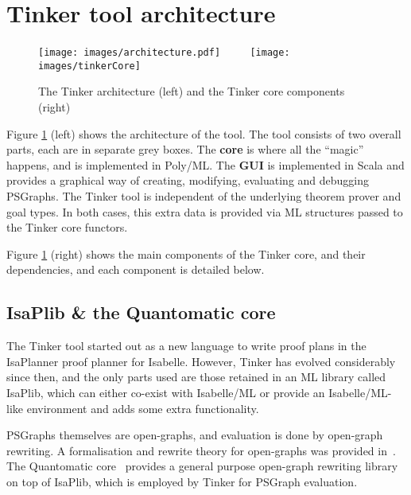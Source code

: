 \documentclass[submission,copyright,creativecommons]{eptcs}
\begin{document}
\section{Tinker tool architecture}\label{sec:arch}


\begin{figure}[h]
\vspace{-15pt}
\begin{center}
\texttt{[image: images/architecture.pdf]}
$\qquad$
\texttt{[image: images/tinkerCore]}
\end{center}
\vspace{-15pt}
\caption{The Tinker architecture (left) and the Tinker core components (right)}\label{fig:arch}
\end{figure}

\noindent Figure \ref{fig:arch} (left) shows the architecture of the tool. The tool consists of two overall parts, each are in separate grey boxes.
The \textbf{core} is where all the ``magic'' happens, and is implemented in Poly/ML. The \textbf{GUI} is implemented in Scala and provides
a graphical way of creating, modifying, evaluating and debugging PSGraphs. The Tinker tool is independent of the underlying theorem prover and goal types. In both cases, this extra data is provided via ML structures passed to the Tinker core functors.

Figure \ref{fig:arch} (right) shows the main components of the Tinker core, and their dependencies, and each component is detailed below.



\subsection{IsaPlib \& the Quantomatic core}\label{sec:quanto}

The Tinker tool started out as a new language to write proof plans in the IsaPlanner proof planner \cite{paper:Dixon:03} for Isabelle. 
However, Tinker has evolved considerably since then, and the only parts used are those  
 retained in an ML library called IsaPlib, which can either co-exist with Isabelle/ML or provide an Isabelle/ML-like environment and adds some extra functionality.



PSGraphs themselves are open-graphs, and evaluation is done by open-graph rewriting. A formalisation and rewrite theory for open-graphs was provided in~\cite{paper:Dixon:10}. The Quantomatic core~\cite{Quantomatic} provides a general purpose open-graph rewriting library on top of IsaPlib, which is employed by Tinker for PSGraph evaluation.
\end{document}
